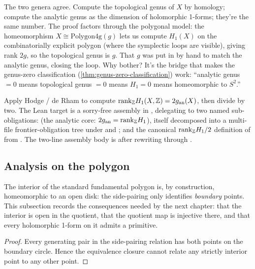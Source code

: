 \begin{layman}
The two genera agree. Compute the topological genus of \(X\) by
homology; compute the analytic genus as the dimension of
holomorphic 1-forms; they're the same number. The proof factors
through the polygonal model: the homeomorphism \(X\cong
\mathrm{Polygon4g}(g)\) lets us compute \(H_1(X)\) on the
combinatorially explicit polygon (where the symplectic loops are
visible), giving rank \(2g\), so the topological genus is \(g\).
That \(g\) was put in by hand to match the analytic genus, closing
the loop. Why bother? It's the bridge that makes the
genus-zero classification (\ref{thm:genus-zero-classification})
work: ``analytic genus \(=0\) means topological genus \(=0\) means
\(H_1=0\) means homeomorphic to \(S^2\).''
\end{layman}

\begin{proofsketch}
Apply Hodge / de Rham to compute \(\mathrm{rank}_{\mathbb{Z}} H_1(X,\mathbb{Z}) = 2 g_{\mathrm{an}}(X)\),
then divide by two. The Lean target
is a sorry-free assembly in
, delegating to two
named sub-obligations:  (the analytic
core: \(2g_{\mathrm{an}} = \mathrm{rank}_{\mathbb{Z}} H_1\)), itself
decomposed into a multi-file frontier-obligation tree under
 and
; and the canonical
\(\mathrm{rank}_{\mathbb{Z}} H_1 / 2\) definition of 
from . The two-line
assembly body is  after rewriting through
.
\end{proofsketch}

\subsection{Analysis on the polygon}

The interior of the standard fundamental polygon is, by construction,
homeomorphic to an open disk: the side-pairing only identifies
\emph{boundary} points. This subsection records the consequences
needed by the next chapter: that the interior is open in the
quotient, that the quotient map is injective there, and that every
holomorphic 1-form on it admits a primitive.


\begin{proof}\leanok
Every generating pair in the side-pairing relation has both points on
the boundary circle. Hence the equivalence closure cannot relate any
strictly interior point to any other point.
\end{proof}

